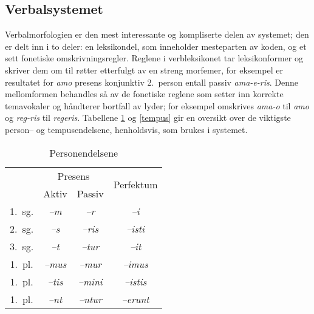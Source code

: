 \documentclass{article}
\begin{document}
\subsection{Verbalsystemet}
\label{conjugation}
Verbalmorfologien er den mest interessante og kompliserte delen av systemet;
den er delt inn i to deler: en leksikondel, som inneholder mesteparten av
koden, og et sett fonetiske omskrivningsregler. Reglene i verbleksikonet tar
leksikonformer og skriver dem om til r\o{}tter etterfulgt av en streng
morfemer, for eksempel er resultatet for \emph{amo} presens konjunktiv
2.~person entall passiv \emph{ama-e-ris}. Denne mellomformen behandles s\aa{}
av de fonetiske reglene som setter inn korrekte temavokaler og h\aa{}ndterer
bortfall av lyder; for eksempel omskrives \emph{ama-o} til \emph{amo} og
\emph{reg-ris} til \emph{regeris}. Tabellene \ref{endelser} og \ref{tempus}
gir en oversikt over de viktigste person-- og tempusendelsene, henholdsvis,
som brukes i systemet.

\begin{table}[hp]
\begin{center}
\begin{tabular}{|c|c|c|c|}
    \hline
       & \multicolumn{2}{c|}{Presens} & \multirow{2}{*}{Perfektum} \\ \cline{2-3}
       & Aktiv & Passiv & \\
    \hline
1.~sg. & \emph{--m}   & \emph{--r}    & \emph{--i}       \\
2.~sg. & \emph{--s}   & \emph{--ris}  & \emph{--isti}    \\
3.~sg. & \emph{--t}   & \emph{--tur}  & \emph{--it}      \\
1.~pl. & \emph{--mus} & \emph{--mur}  & \emph{--imus}    \\
1.~pl. & \emph{--tis} & \emph{--mini} & \emph{--istis}   \\
1.~pl. & \emph{--nt}  & \emph{--ntur} & \emph{--erunt}   \\
    \hline
\end{tabular}
\caption{Personendelsene}
\label{endelser}
\end{center}
\end{table}
\end{document}
